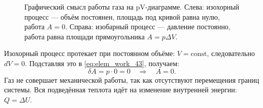 \begin{figure}[htbp]
    \caption{Графический смысл работы газа на pV-диаграмме. Слева: изохорный процесс — объём постоянен, площадь под кривой равна нулю, работа $A = 0$. Справа: изобарный процесс — давление постоянно, работа равна площади прямоугольника $A = p\Delta V$.}
    \label{fig:pv_diagram}
\end{figure}

\begin{theorem}
Изохорный процесс протекает при постоянном объёме: $V = \text{const}$, следовательно $dV = 0$. Подставляя это в \eqref{eq:elem_work_43}, получаем:
\begin{equation}
    \delta A = p \cdot 0 = 0 \quad \Rightarrow \quad A = 0. \label{eq:work_isochoric}
\end{equation}
Газ не совершает механической работы, так как отсутствуют перемещения границ системы. Вся подведённая теплота идёт на изменение внутренней энергии: $Q = \Delta U$.
\end{theorem}


